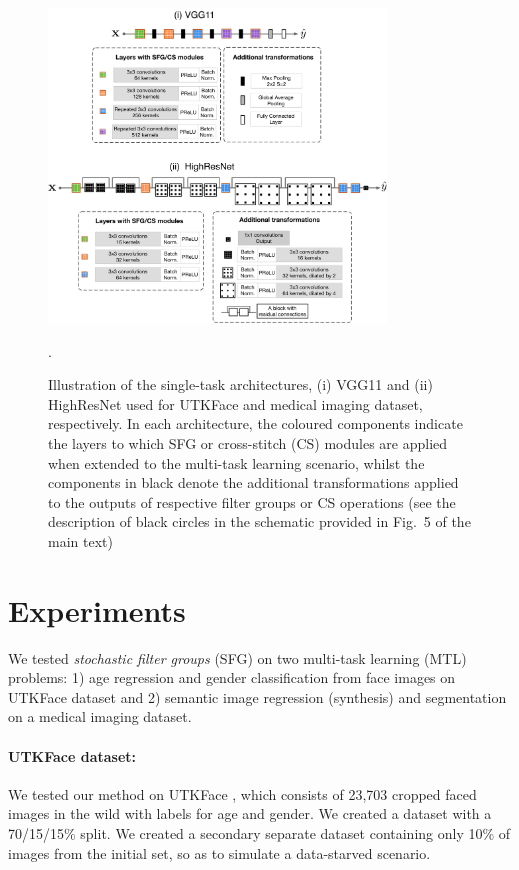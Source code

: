 \begin{figure}[h]
	\centering
	\includegraphics[width=0.80\textwidth]{chapter_6/figures_supp/supp_single_task.pdf}
	\caption{Illustration of the single-task architectures, (i) VGG11 and (ii) HighResNet used for UTKFace and medical imaging dataset, respectively. In each architecture, the coloured components indicate the layers to which SFG or cross-stitch (CS) modules are applied when extended to the multi-task learning scenario, whilst the components in black denote the additional transformations applied to the outputs of respective filter groups or CS operations (see the description of black circles in the schematic provided in Fig.~5 of the main text)}. 
	\label{fig:supp_baselines}
\end{figure}





\section{Experiments}\label{sec:experiments}
We tested \emph{stochastic filter groups} (SFG) on two multi-task learning (MTL) problems: 1) age regression and gender classification from face images on UTKFace dataset \cite{zhifei2017cvpr} and 2) semantic image regression (synthesis) and segmentation on a medical imaging dataset. 

    \paragraph{UTKFace dataset:} We tested our method on UTKFace \cite{zhifei2017cvpr}, which consists of 23,703 cropped faced images in the wild with labels for age and gender. We created a dataset with a 70/15/15\% split. We created a secondary separate dataset containing only 10\% of images from the initial set, so as to simulate a data-starved scenario.

